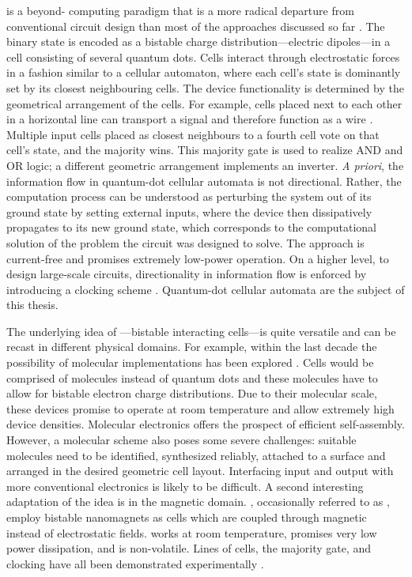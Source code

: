  is a beyond- computing paradigm that is a more radical
departure from conventional  circuit design than most of the
approaches discussed so far \cite{lent1993quantum}. The binary state is encoded
as a bistable charge distribution---electric dipoles---in a cell consisting of
several quantum dots. Cells interact through electrostatic forces in a fashion
similar to a cellular automaton, where each cell's state is dominantly set by
its closest neighbouring cells. The device functionality is determined by the
geometrical arrangement of the cells. For example, cells placed next to each
other in a horizontal line can transport a signal and therefore function as a
wire \cite{lent1993lines}. Multiple input cells placed as closest neighbours to
a fourth cell vote on that cell's state, and the majority wins. This majority
gate is used to realize AND and OR logic; a different geometric arrangement
implements an inverter. \emph{A priori}, the information flow in quantum-dot
cellular automata is not directional. Rather, the computation process can be
understood as perturbing the system out of its ground state by setting external
inputs, where the device then dissipatively propagates to its new ground state,
which corresponds to the computational solution of the problem the circuit was
designed to solve. The approach is current-free and promises extremely low-power
operation. On a higher level, to design large-scale  circuits,
directionality in information flow is enforced by introducing a clocking scheme
\cite{lent1997device}. Quantum-dot cellular automata are the subject of this
thesis.

The underlying idea of ---bistable interacting cells---is quite
versatile and can be recast in different physical domains. For example, within
the last decade the possibility of molecular  implementations has been
explored \cite{lent2000bypassing} \cite{lent2003molecular}. Cells would be
comprised of molecules instead of quantum dots and these molecules have to allow
for bistable electron charge distributions. Due to their molecular scale, these
devices promise to operate at room temperature and allow extremely high device
densities.  Molecular electronics offers the prospect of efficient
self-assembly. However, a molecular  scheme also poses some severe
challenges: suitable molecules need to be identified, synthesized reliably,
attached to a surface and arranged in the desired geometric cell layout.
Interfacing input and output with more conventional electronics is likely to be
difficult. A second interesting adaptation of the  idea is in the
magnetic domain.  \cite{cowburn2000room}
\cite{bernstein2005magnetic}, occasionally referred to as 
\cite{cavin2012science}, employ bistable nanomagnets as cells which are coupled
through magnetic instead of electrostatic fields.  works at room
temperature, promises very low power dissipation, and is non-volatile. Lines of
cells, the majority gate, and clocking have all been demonstrated experimentally
\cite{imre2006majority} \cite{alam2007clocking} \cite{alam2012chip}.

